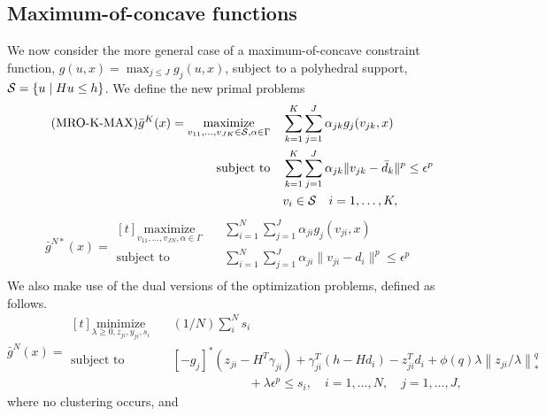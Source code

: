 \documentclass[12pt]{article}
\theoremstyle{thmstyleone}%
\theoremstyle{thmstyletwo}%
\theoremstyle{thmstylethree}%
\newcommand{\reviewChanges}{}
\begin{document}
\reviewChanges{
\subsection{Maximum-of-concave functions}
\label{sub:maxofconcavebounds}
We now consider the more general case of a maximum-of-concave constraint function, $g(u,x) = \max_{j\leq J} g_j(u,x)$, subject to a polyhedral support, $\mathcal{S} = \{u \mid Hu\leq h\}$. We define the new primal problems
\begin{equation}
	\tag{MRO-K-MAX}
	\bar{g}^K(x) = \begin{aligned}[t]
	\label{eq:nocluster_one_max}
	\underset{v_{11},\dots,v_{JK} \in \mathcal{S}, \alpha \in \Gamma}{\text{maximize}} &\quad \sum_{k=1} ^K \sum_{j=1}^J \alpha_{jk} g_j(v_{jk}, x) \\
	\mbox{subject to} & \quad \sum_{k=1}^K \sum_{j=1}^J \alpha_{jk} \| v_{jk} - \bar{d}_k \|^p \le \epsilon^p\\
	& \quad v_i\in \mathcal{S} \quad i = 1,\dots,K,
	\end{aligned}
\end{equation}
\begin{equation}
	\tag{MRO-N*-MAX}
	\label{eq:nocluster_inf_max}
	\bar{g}^{N*}(x) = \begin{aligned}[t]
		\underset{v_{11},\dots,v_{JN}, \alpha \in \Gamma}{\text{maximize}} &\quad \sum_{i=1} ^N \sum_{j=1}^J \alpha_{ji} g_j(v_{ji}, x) \\
		\mbox{subject to} & \quad \sum_{i=1}^N \sum_{j=1}^J \alpha_{ji} \| v_{ji} - d_i \|^p \le \epsilon^p\\
		\end{aligned}
\end{equation}
We also make use of the dual versions of the optimization problems, defined as follows. 
\begin{equation}
	\tag{MRO-N-Dual}
	\bar{g}^N(x) =\begin{aligned}[t]
	\label{eq:nocluster_dual}
	\underset{\lambda \geq 0, z_{ji},y_{ji}, s_i}{\text{minimize}} & \quad(1/N)\sum_i^N  s_i\\
	\mbox{subject to} & \quad[-g_j]^*(z_{ji} - H^T\gamma_{ji}) + \gamma_{ji}^T(h-Hd_i) - z_{ji}^Td_i  + \phi(q)\lambda \left\|z_{ji}/\lambda \right\|^q_* \\	
	& \hspace{3cm} + \lambda \epsilon^p \le s_i, \quad i = 1,\dots,N, \quad j = 1,\dots,J,
\end{aligned}
\end{equation}
where no clustering occurs, and 
}
\end{document}
